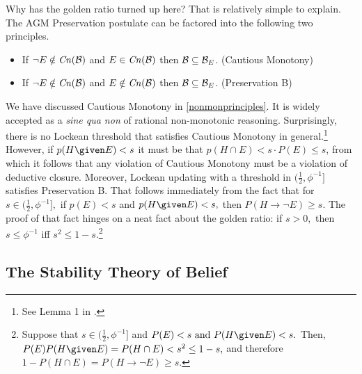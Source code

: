 Why has the golden ratio turned up here? That is relatively simple to explain.
The AGM Preservation postulate can be factored into the following two
principles.
\begin{itemize}
\item[] If $\neg E \notin \text{\textit{Cn}}(\mathcal{B})$ and $E\in \text{\textit{Cn}}(\mathcal{B})$ then $\mathcal{B} \subseteq
\mathcal{B}_E$. \hfill(Cautious Monotony)
\item[] If $\neg E\notin \text{\textit{Cn}}(\mathcal{B})$ and $E\notin \text{\textit{Cn}}(\mathcal{B})$ then $\mathcal{B} \subseteq
\mathcal{B}_E$. \hfill(Preservation B)
\end{itemize}
We have discussed Cautious Monotony in \autoref{nonmonprinciples}. It is widely
accepted as a {\em sine qua non} of rational non-monotonic reasoning.
Surprisingly, there is no  Lockean threshold that satisfies Cautious Monotony in
general.\footnote{See Lemma 1 in \citet{shear2018two}.} However, if $p(H \given
E) < s$ it must be that $p(H\cap E)<s\cdot P(E)\leq s$, from which it follows
that any violation of Cautious Monotony must be a violation of deductive
closure. Moreover, Lockean updating with a threshold in
$(\frac{1}{2},\phi^{-1}]$ satisfies Preservation B. That follows immediately
from the fact that for $s\in(\frac{1}{2},\phi^{-1}],$  if $p(E)<s$ and $p(H
\given E)<s,$ then $P(H\rightarrow\neg E) \geq s.$ The proof of that fact hinges
on a neat fact about the golden ratio: if $s>0,$ then  $s\leq\phi^{-1}$ iff
$s^2 \leq 1-s.$\footnote{Suppose that $s\in(\frac{1}{2},\phi^{-1}]$ and $P(E)<s
\text{ and } P(H \given E)<s.$ Then, $P(E)P(H \given E)=P(H\cap E)<s^2 \leq
1-s,$ and therefore $1-P(H\cap E) = P(H\rightarrow \neg E) \geq s.$}  
  
\subsection{The Stability Theory of Belief}

